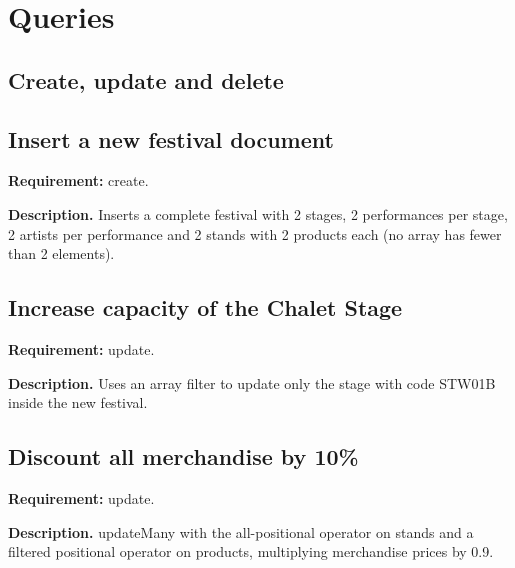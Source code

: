 \chapter{Queries}
\section*{Create, update and delete}
\section{Insert a new festival document}
\textbf{Requirement:} create.

\textbf{Description.} Inserts a complete festival with 2 stages, 2 performances per stage, 2 artists per performance and 2 stands with 2 products each (no array has fewer than 2 elements). 



\section{Increase capacity of the Chalet Stage}
\textbf{Requirement:} update.

\textbf{Description.} Uses an array filter to update only the stage with code STW01B inside the new festival. 



\section{Discount all merchandise by 10\%}
\textbf{Requirement:} update.

\textbf{Description.} updateMany with the all-positional operator on stands and a filtered positional operator on products, multiplying merchandise prices by 0.9. 



